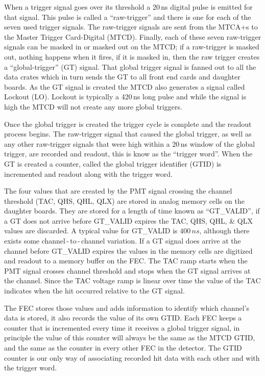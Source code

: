 When a trigger signal goes over its threshold a 20\,ns digital pulse is
emitted for that signal. This pulse is called a ``raw-trigger'' and there is
one for each of the seven used trigger signals.
The raw-trigger signals are sent from the MTCA+s to the Master Trigger
Card-Digital (MTCD).
Finally, each of these seven raw-trigger signals can be masked in or masked out on
the MTCD\@;
if a raw-trigger is masked out, nothing happens when it fires,
if it is masked in, then the raw trigger creates a ``global-trigger'' (GT) signal.
That global trigger signal is fanned out to all the data crates which
in turn sends the GT to all front end cards and daughter boards.
As the GT signal is created the MTCD also generates a signal
called Lockout (LO). Lockout is typically a 420\,ns long pulse and while
the signal is high the MTCD will not create any more global triggers.

Once the global trigger is created the trigger cycle is complete and
the readout process begins.
The raw-trigger signal that caused the global trigger, as well as any other
raw-trigger signals that were high within a 20\,ns window of the global trigger,
are recorded and readout, this is know as the ``trigger word''.
When the GT is created a counter, called the global trigger identifier (GTID) is incremented
and readout along with the trigger word.

The four values that are created by the PMT signal crossing
the channel threshold (TAC, QHS, QHL, QLX) are stored in analog memory
cells on the daughter boards.
They are stored for a length of time known as ``GT\_VALID'', if
a GT does not arrive before GT\_VALID expires the TAC, QHS, QHL, \& QLX values
are discarded. A typical value for GT\_VALID is $400\,ns$, although
there exists some channel\,-\,to\,-\,channel variation.
If a GT signal does arrive at the channel before GT\_VALID expires the
values in the memory cells are digitized and readout to a memory buffer
on the FEC\@.
The TAC ramp starts when the PMT signal crosses channel threshold
and stops when the GT signal arrives at the channel.
Since the TAC voltage ramp is linear over time the value of the TAC
indicates when the hit occurred relative to the GT signal.

The FEC stores those values and adds information to identify which
channel's data is stored, it also records the value of its own GTID\@.
Each FEC keeps a counter that is incremented every time it receives a global
trigger signal, in principle the value of this counter will always be the same
as the MTCD GTID, and the same as the counter in every other FEC in the detector.
The GTID counter is our only way of associating recorded hit data with each other
and with the trigger word.

